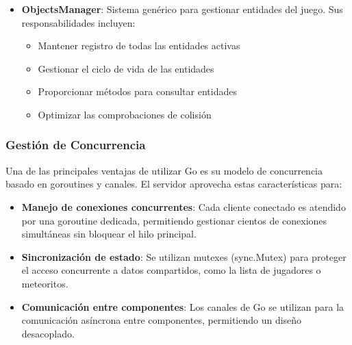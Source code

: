\documentclass[12pt,letterpaper]{article}
\begin{document}
\begin{itemize}
    \item \textbf{ObjectsManager}: Sistema genérico para gestionar entidades del juego. Sus responsabilidades incluyen:
    \begin{itemize}
        \item Mantener registro de todas las entidades activas
        \item Gestionar el ciclo de vida de las entidades
        \item Proporcionar métodos para consultar entidades
        \item Optimizar las comprobaciones de colisión
    \end{itemize}
\end{itemize}

\subsubsection{Gestión de Concurrencia}

Una de las principales ventajas de utilizar Go es su modelo de concurrencia basado en goroutines y canales. El servidor aprovecha estas características para:

\begin{itemize}
    \item \textbf{Manejo de conexiones concurrentes}: Cada cliente conectado es atendido por una goroutine dedicada, permitiendo gestionar cientos de conexiones simultáneas sin bloquear el hilo principal.
    
    \item \textbf{Sincronización de estado}: Se utilizan mutexes (sync.Mutex) para proteger el acceso concurrente a datos compartidos, como la lista de jugadores o meteoritos.
    
    \item \textbf{Comunicación entre componentes}: Los canales de Go se utilizan para la comunicación asíncrona entre componentes, permitiendo un diseño desacoplado.
\end{itemize}
\end{document}
